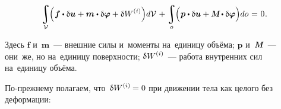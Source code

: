 \begin{otherlanguage}{russian}
\nopagebreak\vspace{-0.1em}\begin{equation}
\integral\displaylimits_{\mathcal{V}} \hspace{-0.64ex} \left(^{\mathstrut} \bm{f} \dotp \variation{\fieldofdisplacements} + \bm{m} \dotp \variation{\fieldofrotations} + \variation{\internalwork} \hspace{.15ex} \right) \hspace{-0.4ex} d\mathcal{V}
\hspace{.25ex} +
\integral\displaylimits_o \hspace{-0.64ex} \left(^{\mathstrut} \bm{p} \dotp \variation{\fieldofdisplacements} + \mathboldM \hspace{-0.1ex} \dotp \variation{\fieldofrotations} \right) \hspace{-0.4ex} do \hspace{0.12ex} = \hspace{0.1ex} 0 \hspace{0.1ex}.
\end{equation}

\vspace{-0.1em} \noindent Здесь $\bm{f}$ и~$\bm{m}$~--- внешние силы и~моменты на~единицу объёма; $\bm{p}$ и~$\mathboldM$~--- они~же, но на~единицу поверхности; ${\variation{\internalwork}}$~--- работа внутренних сил на~единицу объёма.

По\hbox{-}прежнему полагаем, что~${\variation{\internalwork} = 0}$ при движении тела как целого без деформации:


\end{otherlanguage}
